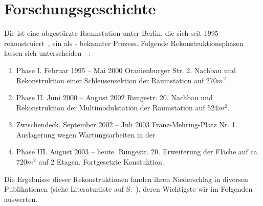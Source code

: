 \section*{Forschungsgeschichte}
\fancyhead[LO]{}

    Die  ist eine abgestürzte Raumstation unter Berlin, die sich seit 1995 rekonstruiert~\cite{cbasebook}, ein als  -  bekannter Prozess. Folgende Rekonstruktionsphasen lassen sich unterscheiden~\cite{cbasepressemap}~\cite{cbasebook}:
    \begin{enumerate}
        \item Phase I.  Februar 1995 -- Mai 2000 Oranienburger Str. 2.  Nachbau und Rekonstruktion einer Schleusensektion der  Raumstation auf 270$m^2$.~\cite{cbasepressemap}~\cite{cbasebook} 
        \item Phase II.   Juni 2000 -- August 2002 Rungestr. 20.  Nachbau und Rekonstruktion der Multimodulstation  der  Raumstation auf 524$m^2$.~\cite{cbasepressemap}~\cite{cbasebook} 
        \item Zwischendeck.  September 2002 -- Juli 2003 Franz-Mehring-Platz Nr. 1. 
        Auslagerung wegen Wartungsarbeiten in der ~\cite{cbasepressemap}~\cite{cbasebook} 
        \item Phase III.  August 2003 -- heute. Rungestr. 20. 
         Erweiterung der Fläche auf ca. 720$m^2$ auf 2 Etagen. Fortgesetzte Konstuktion.
    \end{enumerate}

Die Ergebnisse dieser Rekonstruktionen fanden ihren Niederschlag in diversen Publikationen (siehe Literaturliste auf S.~\pageref{sec:literatur}), deren Wichtigste wir im Folgenden auswerten. 
